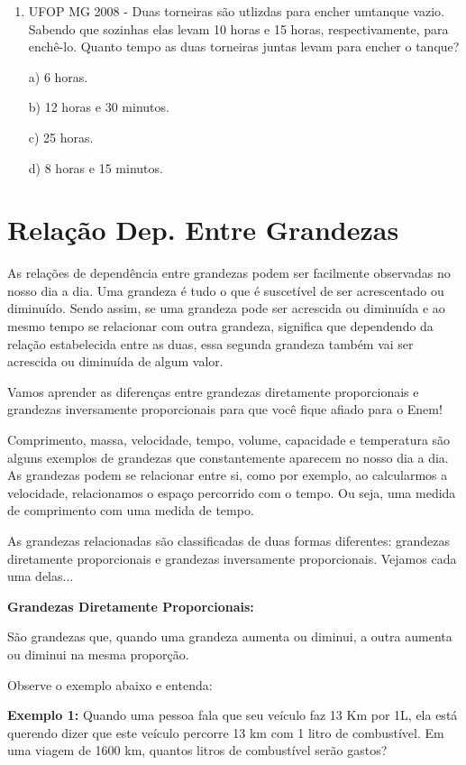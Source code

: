 \begin{multicols*}{2}
\begin{enumerate}
        \item UFOP MG 2008 - Duas torneiras são utlizdas para encher umtanque vazio. Sabendo que sozinhas elas levam 10 horas e 15 horas, respectivamente, para enchê-lo. Quanto tempo as duas torneiras juntas levam para encher o tanque?

              a)	6 horas.

              b) 12 horas e 30 minutos.

              c) 25 horas.

              d) 8 horas e 15 minutos.\\

    \end{enumerate}

    \section*{Relação Dep. Entre Grandezas}

    As relações de dependência entre grandezas podem ser facilmente observadas no nosso dia a dia. Uma grandeza é tudo o que é suscetível de ser acrescentado ou diminuído. Sendo assim, se uma grandeza pode ser acrescida ou diminuída e ao mesmo tempo se relacionar com outra grandeza, significa que dependendo da relação estabelecida entre as duas, essa segunda grandeza também vai ser acrescida ou diminuída de algum valor.

    Vamos aprender as diferenças entre grandezas diretamente proporcionais e grandezas inversamente proporcionais para que você fique afiado para o Enem!

    Comprimento, massa, velocidade, tempo, volume, capacidade e temperatura são alguns exemplos de grandezas que constantemente aparecem no nosso dia a dia. As grandezas podem se relacionar entre si,  como por exemplo, ao calcularmos a velocidade, relacionamos o espaço percorrido com o tempo. Ou seja, uma medida de comprimento com uma medida de tempo.

    As grandezas relacionadas são classificadas de duas formas diferentes: grandezas diretamente proporcionais  e grandezas inversamente proporcionais. Vejamos cada uma delas...

    \textbf{Grandezas Diretamente Proporcionais:}

    São grandezas que, quando uma grandeza aumenta ou diminui, a outra aumenta ou diminui na mesma proporção.

    Observe o exemplo abaixo e entenda:

    \textbf{Exemplo 1:} Quando uma pessoa fala que seu veículo faz 13 Km por 1L, ela está querendo dizer que este veículo percorre 13 km com 1 litro de combustível. Em uma viagem de 1600 km, quantos litros de combustível serão gastos?


\end{multicols*}
